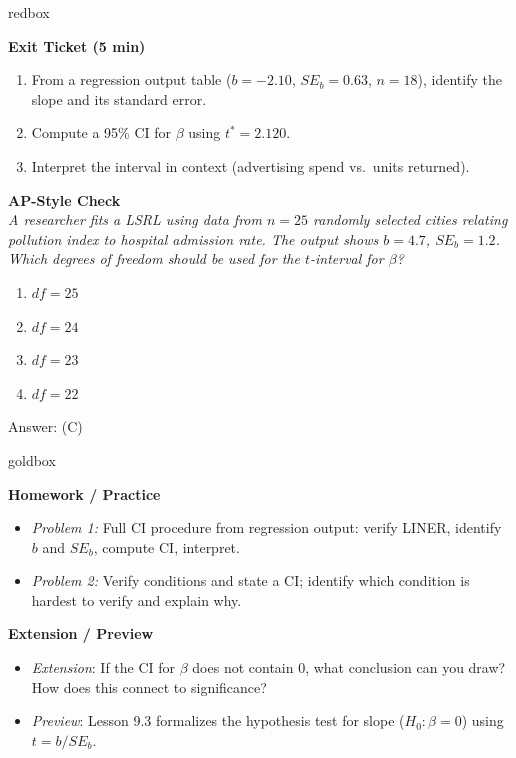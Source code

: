 \documentclass[10pt]{article}
\begin{document}
\begin{skillbox}{redbox}
\begin{minipage}[t]{0.48\linewidth}
    \textbf{Exit Ticket (5 min)}
    \begin{enumerate}
        \item From a regression output table ($b = -2.10$, $SE_b = 0.63$, $n = 18$),
              identify the slope and its standard error.
        \item Compute a 95\% CI for $\beta$ using $t^* = 2.120$.
        \item Interpret the interval in context (advertising spend vs.\ units returned).
    \end{enumerate}
\end{minipage}
\hfill
\begin{minipage}[t]{0.48\linewidth}
    \textbf{AP-Style Check}\\
    \textit{A researcher fits a LSRL using data from $n = 25$ randomly selected cities
    relating pollution index to hospital admission rate. The output shows $b = 4.7$,
    $SE_b = 1.2$. Which degrees of freedom should be used for the $t$-interval for $\beta$?}
    \begin{enumerate}[label=(\Alph*)]
        \item $df = 25$
        \item $df = 24$
        \item $df = 23$
        \item $df = 22$
    \end{enumerate}
    Answer: (C)
\end{minipage}
\end{skillbox}

\begin{skillbox}{goldbox}
\begin{minipage}[t]{0.48\linewidth}
    \textbf{Homework / Practice}
    \begin{itemize}
        \item \textit{Problem 1:} Full CI procedure from regression output: verify LINER,
              identify $b$ and $SE_b$, compute CI, interpret.
        \item \textit{Problem 2:} Verify conditions and state a CI; identify which
              condition is hardest to verify and explain why.
    \end{itemize}
\end{minipage}
\hfill
\begin{minipage}[t]{0.48\linewidth}
    \textbf{Extension / Preview}
    \begin{itemize}
        \item \textit{Extension}: If the CI for $\beta$ does not contain 0, what
              conclusion can you draw? How does this connect to significance?
        \item \textit{Preview}: Lesson 9.3 formalizes the hypothesis test for slope
              ($H_0\colon \beta = 0$) using $t = b/SE_b$.
    \end{itemize}
\end{minipage}
\end{skillbox}
\end{document}
